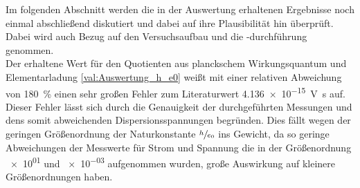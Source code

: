 Im folgenden Abschnitt werden die in der Auswertung erhaltenen Ergebnisse
noch einmal abschließend diskutiert und dabei auf ihre Plausibilität hin
überprüft. Dabei wird auch Bezug auf den Versuchsaufbau und die -durchführung genommen.\\

Der erhaltene Wert für den Quotienten aus planckschem Wirkungsquantum und 
Elementarladung \cref{val:Auswertung_h_e0} weißt mit einer relativen Abweichung
von \SI{180}{\percent} einen sehr großen Fehler 
zum Literaturwert \SI{4,136e-15}{\volt\second} \cite{SciPy} auf.
Dieser Fehler lässt sich durch die Genauigkeit der durchgeführten Messungen und dens
somit abweichenden Dispersionsspannungen begründen. 
Dies fällt wegen der geringen Größenordnung der Naturkonstante $ \sfrac{h}{e_{0}} $ ins
Gewicht, da so geringe Abweichungen der Messwerte für Strom und Spannung die 
in der Größenordnung \num{e01} und \num{e-03} aufgenommen wurden, große 
Auswirkung auf kleinere Größenordnungen haben.


  